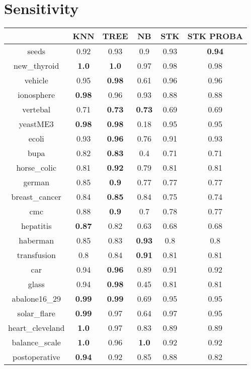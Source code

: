 \documentclass{article}%
\begin{document}
\section*{Sensitivity}%
\begin{tabular}{c|ccccc}%
&KNN&TREE&NB&STK&STK PROBA\\%
\hline%
seeds&0.92&0.93&0.9&0.93&\textbf{0.94}\\%
new\_thyroid&\textbf{1.0}&\textbf{1.0}&0.97&0.98&0.98\\%
vehicle&0.95&\textbf{0.98}&0.61&0.96&0.96\\%
ionosphere&\textbf{0.98}&0.96&0.93&0.88&0.88\\%
vertebal&0.71&\textbf{0.73}&\textbf{0.73}&0.69&0.69\\%
yeastME3&\textbf{0.98}&\textbf{0.98}&0.18&0.95&0.95\\%
ecoli&0.93&\textbf{0.96}&0.76&0.91&0.93\\%
bupa&0.82&\textbf{0.83}&0.4&0.71&0.71\\%
horse\_colic&0.81&\textbf{0.92}&0.79&0.81&0.81\\%
german&0.85&\textbf{0.9}&0.77&0.77&0.77\\%
breast\_cancer&0.84&\textbf{0.85}&0.84&0.75&0.74\\%
cmc&0.88&\textbf{0.9}&0.7&0.78&0.77\\%
hepatitis&\textbf{0.87}&0.82&0.63&0.68&0.68\\%
haberman&0.85&0.83&\textbf{0.93}&0.8&0.8\\%
transfusion&0.8&0.84&\textbf{0.91}&0.81&0.81\\%
car&0.94&\textbf{0.96}&0.89&0.91&0.92\\%
glass&0.94&\textbf{0.98}&0.45&0.81&0.81\\%
abalone16\_29&\textbf{0.99}&\textbf{0.99}&0.69&0.95&0.95\\%
solar\_flare&\textbf{0.99}&0.97&0.64&0.97&0.95\\%
heart\_cleveland&\textbf{1.0}&0.97&0.83&0.89&0.89\\%
balance\_scale&\textbf{1.0}&0.96&\textbf{1.0}&0.92&0.92\\%
postoperative&\textbf{0.94}&0.92&0.85&0.88&0.82\\%
\end{tabular}

%
\end{document}
